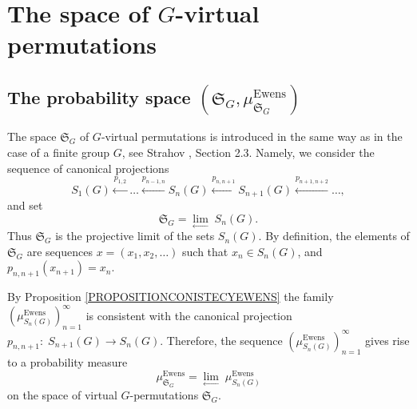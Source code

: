 \documentclass[12pt]{amsart}
\theoremstyle{definition}
\numberwithin{equation}{section}
\DeclareMathOperator{\Ewens}{Ewens}
\begin{document}
\section{The space of $G$-virtual permutations}\label{THESPACEOFVIRTUALPERMUTATIONS}
\subsection{The probability space $\left(\mathfrak{S}_{G},\mu_{\mathfrak{S}_G}^{\Ewens}\right)$}\label{Section4.1}
The space $\mathfrak{S}_{G}$ of $G$-virtual permutations is introduced in the same way as in the case of a finite group $G$, see Strahov \cite{StrahovIsr25}, Section 2.3. Namely, we consider the sequence of canonical projections
$$
S_1(G)\overset{p_{1,2}}{\longleftarrow}\ldots\overset{p_{n-1,n}}{\longleftarrow} S_n(G)\overset{p_{n,n+1}}{\longleftarrow} S_{n+1}(G)\overset{p_{n+1,n+2}}{\longleftarrow}\ldots,
$$
and set
$$
\mathfrak{S}_G=\underset{\longleftarrow}{\lim}\;S_n(G).
$$
Thus $\mathfrak{S}_G$ is the projective limit of the sets $S_n(G)$.  By definition, the elements of $\mathfrak{S}_{G}$
are sequences $x=\left(x_1,x_2,\ldots\right)$ such that $x_n\in S_n\left(G\right)$, and $p_{n,n+1}\left(x_{n+1}\right)=x_n$.

By Proposition \ref{PROPOSITIONCONISTECYEWENS} the family $\left(\mu_{S_n(G)}^{\Ewens}\right)_{n=1}^{\infty}$
is consistent with the canonical projection $p_{n,n+1}:\; S_{n+1}(G)\longrightarrow S_n(G)$.
Therefore, the sequence $\left(\mu^{\Ewens}_{S_n(G)}\right)_{n=1}^{\infty}$ gives rise to a probability measure
$$
\mu_{\mathfrak{S}_G}^{\Ewens}=\underset{\longleftarrow}{\lim}\;\mu^{\Ewens}_{S_n(G)}
$$
on the space of virtual $G$-permutations $\mathfrak{S}_{G}$.
\end{document}
